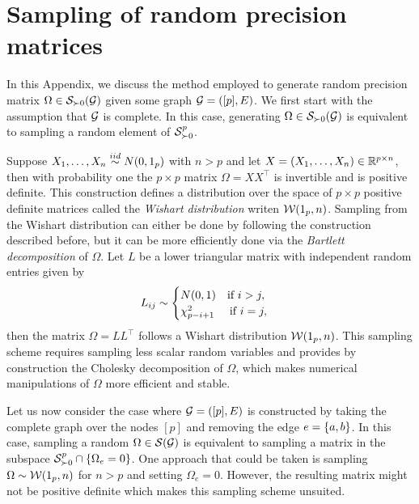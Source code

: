 \section{Sampling of random precision matrices} \label{sec-precision-sampling}

In this Appendix, we discuss the method employed to generate random precision matrix $\Omega \in \S_{\succ 0}(\G)$ given some graph $\G = ([p], E)$. We first start with the assumption that $\G$ is complete. In this case, generating $\Omega \in \S_{\succ 0}(\G)$ is equivalent to sampling a random element of $\S^p_{\succ 0}$. 

Suppose $X_1, \ldots, X_n \simiid N(0, 1_p)$ with $n > p$ and let $X = (X_1, \ldots, X_n) \in \R^{p\times n}$, then with probability one the $p \times p$ matrix $\Omega = XX^\top$ is invertible and is positive definite. This construction defines a distribution over the space of $p \times p$ positive definite matrices called the \textit{Wishart distribution} writen $\c{W}(1_p, n)$. Sampling from the Wishart distribution can either be done by following the construction described before, but it can be more efficiently done via the \textit{Bartlett decomposition} \cite{10.2307/2346290} of $\Omega$. Let $L$ be a lower triangular matrix with independent random entries given by
\begin{equation*}
    L_{ij} \sim \begin{cases}
        N(0, 1) \ \ \t{ if } i > j,\\
        \chi^2_{p - i + 1} \ \ \ \t{ if } i = j,
    \end{cases}
\end{equation*}
then the matrix $\Omega = L L^\top$ follows a Wishart distribution $\c{W}(1_p, n)$. This sampling scheme requires sampling less scalar random variables and provides by construction the Cholesky decomposition of $\Omega$, which makes numerical manipulations of $\Omega$ more efficient and stable.

Let us now consider the case where $\G = ([p], E)$ is constructed by taking the complete graph over the nodes $[p]$ and removing the edge $e = \eset{a, b}$. In this case, sampling a random $\Omega \in \S(\G)$ is equivalent to sampling a matrix in the subspace $\S^p_{\succ 0} \cap \eset{ \Omega_e = 0}$. One approach that could be taken is sampling $\Omega \sim \c{W}(1_p, n)$ for $n > p$ and setting $\Omega_e = 0$. However, the resulting matrix might not be positive definite which makes this sampling scheme unsuited.


